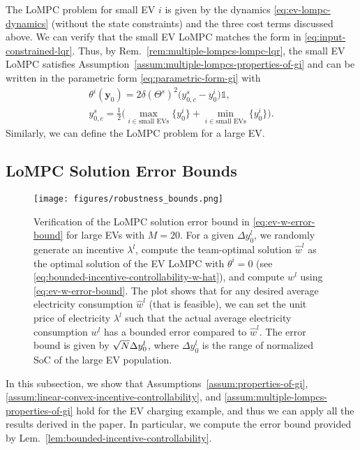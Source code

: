 The LoMPC problem for small EV $i$ is given by the dynamics \eqref{eq:ev-lompc-dynamics} (without the state constraints) and the three cost terms discussed above.
We can verify that the small EV LoMPC matches the form in \eqref{eq:input-constrained-lqr}.
Thus, by Rem.~\ref{rem:multiple-lompcs-lompc-lqr}, the small EV LoMPC satisfies Assumption~\ref{assum:multiple-lompcs-properties-of-gi} and can be written in the parametric form \eqref{eq:parametric-form-gi} with
\begin{equation}
\begin{gathered}
    \theta^i(\bm{y}_0) = 2\delta (\Theta^s)^2 \bigl( y^s_{0, c} - y^i_0 \bigr) \mathbb{1}, \\
    y^s_{0, c} = \frac{1}{2} \biggl(\max_{i \in \text{small EVs}} \{y^i_0\} + \min_{i \in \text{small EVs}} \{y^i_0\}\biggr).
\end{gathered}
\end{equation}
Similarly, we can define the LoMPC problem for a large EV.


\subsection{LoMPC Solution Error Bounds}
\label{subsec:ev-lompc-solution-error-bounds}

\begin{figure}%
    \centering
    \texttt{[image: figures/robustness\_bounds.png]}
    \caption{Verification of the LoMPC solution error bound in \eqref{eq:ev-w-error-bound} for large EVs with $M = 20$.
    For a given $\Delta y^l_0$, we randomly generate an incentive $\lambda^l$, compute the team-optimal solution $\hat{w}^l$ as the optimal solution of the EV LoMPC with $\theta^i = 0$ (see \eqref{eq:bounded-incentive-controllability-w-hat}), and compute $w^l$ using \eqref{eq:ev-w-error-bound}.
    The plot shows that for any desired average electricity consumption $\hat{w}^l$ (that is feasible), we can set the unit price of electricity $\lambda^l$ such that the actual average electricity consumption $w^l$ has a bounded error compared to $\hat{w}^l$.
    The error bound is given by $\sqrt{N} \Delta y^l_0$, where $\Delta y^l_0$ is the range of normalized SoC of the large EV population.
    }
    \label{fig:ev-robustness-bound}
\end{figure}

In this subsection, we show that Assumptions~\ref{assum:properties-of-gi}, \ref{assum:linear-convex-incentive-controllability}, and \ref{assum:multiple-lompcs-properties-of-gi} hold for the EV charging example, and thus we can apply all the results derived in the paper.
In particular, we compute the error bound provided by Lem.~\ref{lem:bounded-incentive-controllability}.

